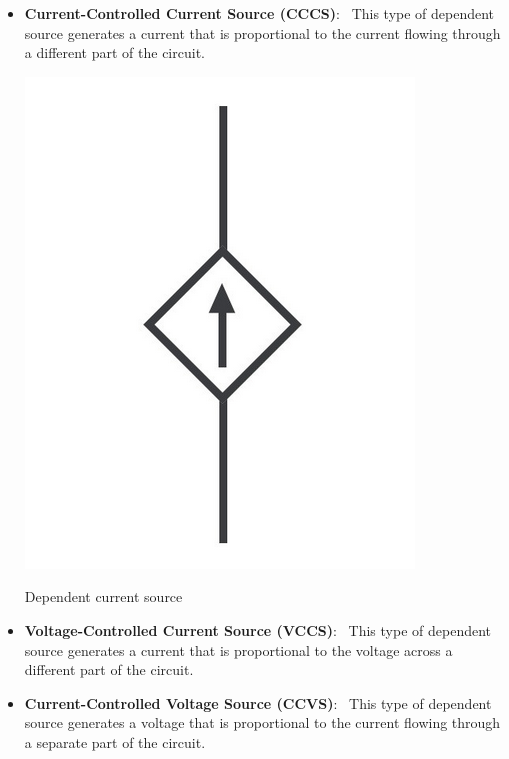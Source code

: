 \documentclass[nobib]{tufte-handout}
\newcommand{\defn}[2]{\noindent\textbf{#1}:\ #2}
\begin{document}
\begin{itemize}
    \item \defn{Current-Controlled Current Source (CCCS)}{
    This type of dependent source generates a current 
    that is proportional to the current flowing 
    through a different part of the circuit.}
    \begin{marginfigure}
        \centering
        \includegraphics[width=\textwidth/2]{images/dependentcurrentsource.png}
        \caption{Dependent current source}
        \label{fig:dependentcurrentsource}
    \end{marginfigure} 


    \item \defn{Voltage-Controlled Current Source (VCCS)}{
    This type of dependent source generates a 
    current that is proportional to the 
    voltage across a different part of the 
    circuit.}
    \item \defn{Current-Controlled Voltage Source (CCVS)}{
    This type of dependent source generates a 
    voltage that is proportional to the 
    current flowing through a separate part 
    of the circuit.}
\end{itemize}
\end{document}
